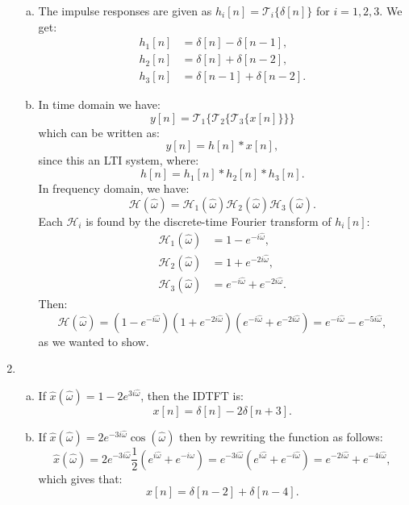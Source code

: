 \begin{enumerate}
\begin{enumerate}[a)]
\item The impulse responses are given as $h_{i}[n]=\mathcal{T}_{i}\{\delta[n]\}$ for $i=1,2,3$. We get:
\begin{align*}
    h_{1}[n]&=\delta[n]-\delta[n-1], \\
    h_{2}[n]&=\delta[n]+\delta[n-2], \\
    h_{3}[n]&=\delta[n-1]+\delta[n-2].
\end{align*}

\item In time domain we have:
$$y[n]=\mathcal{T}_{1}\{\mathcal{T}_{2}\{\mathcal{T}_{3}\{x[n]\}\}\}$$
which can be written as:
$$y[n]=h[n]*x[n],$$
since this an LTI system, where:
$$h[n]=h_{1}[n]*h_{2}[n]*h_{3}[n].$$
In frequency domain, we have:
$$\mathcal{H}(\hat{\omega})=\mathcal{H}_{1}(\hat{\omega})\mathcal{H}_{2}(\hat{\omega})\mathcal{H}_{3}(\hat{\omega}).$$
Each $\mathcal{H}_{i}$ is found by the discrete-time Fourier transform of $h_{i}[n]$:
\begin{align*}
    \mathcal{H}_{1}(\hat{\omega})&=1-e^{-i\hat{\omega}}, \\
    \mathcal{H}_{2}(\hat{\omega})&=1+e^{-2i\hat{\omega}}, \\
    \mathcal{H}_{3}(\hat{\omega})&=e^{-i\hat{\omega}}+e^{-2i\hat{\omega}}.
\end{align*}
Then:
$$\mathcal{H}(\hat{\omega})=(1-e^{-i\hat{\omega}})(1+e^{-2i\hat{\omega}})(e^{-i\hat{\omega}}+e^{-2i\hat{\omega}})=e^{-i\hat{\omega}}-e^{-5i\hat{\omega}},$$
as we wanted to show. 
\end{enumerate}

\item

\begin{enumerate}[a)]
\item If $\hat{x}(\hat{\omega})=1-2e^{3i\hat{\omega}}$, then the IDTFT is:
$$x[n]=\delta[n]-2\delta[n+3].$$

\item If $\hat{x}(\hat{\omega})=2e^{-3i\hat{\omega}}\cos(\hat{\omega})$ then by rewriting the function as follows:
$$\hat{x}(\hat{\omega})=2e^{-3i\hat{\omega}}\frac{1}{2}(e^{i\hat{\omega}}+e^{-i\hat{\omega}})=e^{-3i\hat{\omega}}(e^{i\hat{\omega}}+e^{-i\hat{\omega}})=e^{-2i\hat{\omega}}+e^{-4i\hat{\omega}},$$
which gives that:
$$x[n]=\delta[n-2]+\delta[n-4].$$


\end{enumerate}
\end{enumerate}
